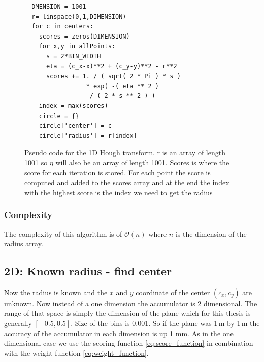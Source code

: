 \documentclass[11pt,twoside]{scrreprt}
\begin{document}
\begin{figure}
  \begin{lstlisting}
  DMENSION = 1001
  r= linspace(0,1,DIMENSION)
  for c in centers:
    scores = zeros(DIMENSION)
    for x,y in allPoints:
      s = 2*BIN_WIDTH
      eta = (c_x-x)**2 + (c_y-y)**2 - r**2
      scores += 1. / ( sqrt( 2 * Pi ) * s ) 
                 * exp( -( eta ** 2 ) 
                  / ( 2 * s ** 2 ) )
    index = max(scores)
    circle = {}
    circle['center'] = c
    circle['radius'] = r[index]
\end{lstlisting}
\caption[Pseudo Code 1D HT]{Pseudo code for the 1D Hough transform. r is an array of length 1001 so $\eta$ will also be an 
array of length 1001. Scores is where the score for each iteration is stored. For each point the score is computed and added 
to the scores array and at the end the index with the highest score is the index we need to get the radius}
\end{figure}

\subsubsection{Complexity} %
The complexity of this algorithm is of $\mathcal{O}(n)$ where $n$ is the dimension of the radius array.
\label{ssub:complexity_1d}


\subsection{2D: Known radius - find center} %
\label{sub:2d_known_radius_find_center}
Now the radius is known and the $x$ and $y$ coordinate of the center $(c_x, c_y)$ are unknown. Now instead of a one dimension the 
accumulator is 2 dimensional. The range of that space is simply the dimension of the plane which for this thesis is generally 
$[-0.5,0.5]$. Size of the bins is 0.001. So if the plane was 1\,m by 1\,m the accuracy of the accumulator in each dimension is 
up 1 mm. As in the one dimensional case we use the scoring function \ref{eq:score_function} in combination with the weight 
function \ref{eq:weight_function}.
\end{document}
